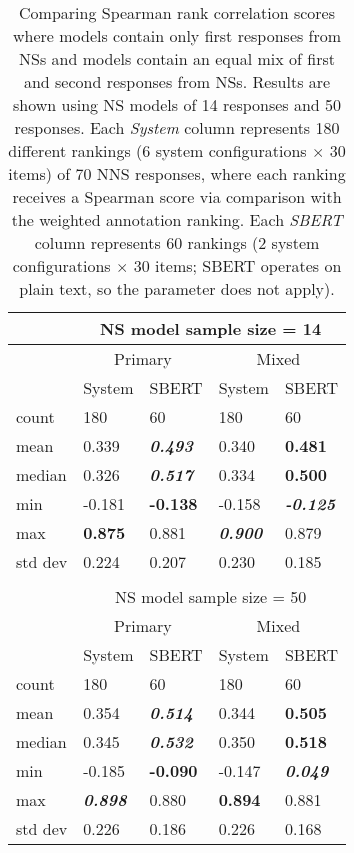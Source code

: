 \begin{table}[htb!]
\begin{center}
\begin{tabular}{|l||l|l||l|l|}
\hline
 & \multicolumn{4}{c|}{NS model sample size = 14} \\
 \hline
 & \multicolumn{2}{c||}{Primary} & \multicolumn{2}{c|}{Mixed} \\
\hline
			& System 		& SBERT 		& System 	& SBERT \\
\hline
\hline
count 		& 180 			& 60 		& 180 		& 60 \\
\hline
mean 		& 0.339 & \textit{\textbf{0.493}} 	& 0.340 	& \textbf{0.481} \\
\hline
median 	& 0.326 & \textit{\textbf{0.517}} & 0.334 	& \textbf{0.500} \\
\hline
min 	& -0.181 & \textbf{-0.138} 		& -0.158 	& \textit{\textbf{-0.125}} \\
\hline
max & \textbf{0.875} & 0.881 & \textit{\textbf{0.900}} & 0.879 \\
\hline
std dev & 0.224 			& 0.207 	& 0.230 	& 0.185 \\
\hline
\multicolumn{5}{c}{} \\
\hline
& \multicolumn{4}{c|}{NS model sample size = 50} \\
\hline
& \multicolumn{2}{c||}{Primary} & \multicolumn{2}{c|}{Mixed} \\
\hline
 			& System 		& SBERT 				& System 			& SBERT \\
\hline
count 		& 180 			& 60 				& 180 				& 60 \\
\hline
mean 		& 0.354 	& \textit{\textbf{0.514}} 	& 0.344 	& \textbf{0.505} \\
\hline
median  	& 0.345 	& \textit{\textbf{0.532}} 	& 0.350 	& \textbf{0.518}  \\
\hline
min  		& -0.185 	& \textbf{-0.090} 		& -0.147 		& \textit{\textbf{0.049}}  \\
\hline
max 		& \textit{\textbf{0.898}} & 0.880 	& \textbf{0.894} 	& 0.881 \\
\hline
std dev 	& 0.226 	& 0.186 					& 0.226 		& 0.168 \\
\hline
\end{tabular}
\caption{\label{tab:primacy-results} Comparing Spearman rank correlation scores where  models contain only first responses from NSs and  models contain an equal mix of first and second responses from NSs. Results are shown using NS models of 14 responses and 50 responses. Each \textit{System} column represents 180 different rankings (6 system configurations $\times$ 30 items) of 70 NNS responses, where each ranking receives a Spearman score via comparison with the weighted annotation ranking. Each \textit{SBERT} column represents 60 rankings (2 system configurations $\times$ 30 items; SBERT operates on plain text, so the  parameter does not apply).
}
\end{center}
\end{table}


